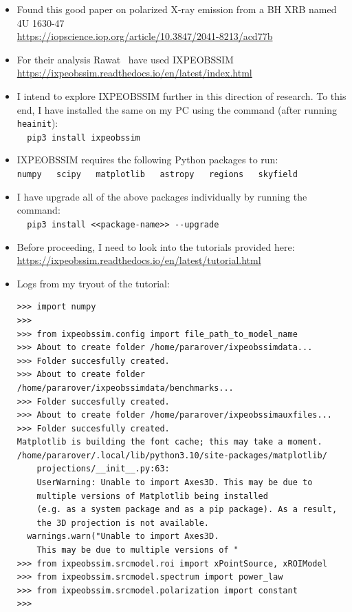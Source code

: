     \begin{itemize}
        \item Found this good paper on polarized X-ray emission from a BH XRB named 4U 1630-47\\
        \url{https://iopscience.iop.org/article/10.3847/2041-8213/acd77b}

        \item For their analysis Rawat \etal\ have used IXPEOBSSIM\\
        \url{https://ixpeobssim.readthedocs.io/en/latest/index.html}

        \item I intend to explore IXPEOBSSIM further in this direction of research. To this end, I have installed the same on my PC using the command (after running \verb|heainit|):\\
        \verb|  pip3 install ixpeobssim|

        \item IXPEOBSSIM requires the following Python packages to run:\\
        \verb|numpy   scipy   matplotlib   astropy   regions   skyfield|

        \item I have upgrade all of the above packages individually by running the command:\\
        \verb|  pip3 install <<package-name>> --upgrade|

        \item Before proceeding, I need to look into the tutorials provided here:\\
        \url{https://ixpeobssim.readthedocs.io/en/latest/tutorial.html}

        \item Logs from my tryout of the tutorial:
        \begin{verbatim}
>>> import numpy
>>> 
>>> from ixpeobssim.config import file_path_to_model_name
>>> About to create folder /home/pararover/ixpeobssimdata...
>>> Folder succesfully created.
>>> About to create folder /home/pararover/ixpeobssimdata/benchmarks...
>>> Folder succesfully created.
>>> About to create folder /home/pararover/ixpeobssimauxfiles...
>>> Folder succesfully created.
Matplotlib is building the font cache; this may take a moment.
/home/pararover/.local/lib/python3.10/site-packages/matplotlib/
    projections/__init__.py:63:
    UserWarning: Unable to import Axes3D. This may be due to 
    multiple versions of Matplotlib being installed
    (e.g. as a system package and as a pip package). As a result,
    the 3D projection is not available.
  warnings.warn("Unable to import Axes3D.
    This may be due to multiple versions of "
>>> from ixpeobssim.srcmodel.roi import xPointSource, xROIModel
>>> from ixpeobssim.srcmodel.spectrum import power_law
>>> from ixpeobssim.srcmodel.polarization import constant
>>> 
        \end{verbatim}
    \end{itemize}